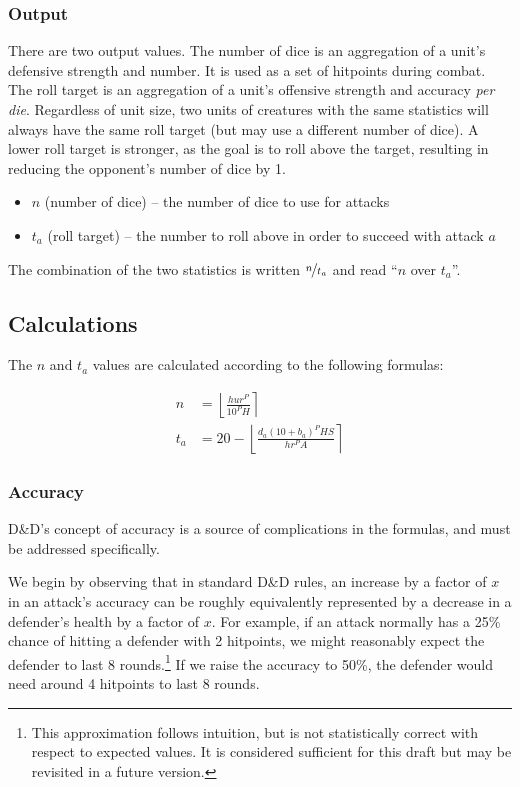 \documentclass[twocolumn]{article}
\begin{document}
\subsubsection{Output}

There are two output values.
The number of dice is an aggregation of a unit's defensive strength and number.
It is used as a set of hitpoints during combat.
The roll target is an aggregation
of a unit's offensive strength and accuracy \emph{per die}.
Regardless of unit size,
two units of creatures with the same statistics
will always have the same roll target
(but may use a different number of dice).
A lower roll target is stronger,
as the goal is to roll above the target,
resulting in reducing the opponent's number of dice by 1.

\begin{itemize}
    \item $n$ (number of dice) -- the number of dice to use for attacks
    \item $t_a$ (roll target) -- the number to roll above in order to succeed with attack $a$
\end{itemize}

The combination of the two statistics is written $\nicefrac{n}{t_a}$
and read ``$n$ over $t_a$''.

\subsection{Calculations}

The $n$ and $t_a$ values are calculated according to the following formulas:

\begin{align*}
    n   &=  
        \left\lfloor
            \frac
                {h u r^P}
                {10^P H}
        \right\rceil \\
    t_a &=
        20 -
        \left\lfloor
            \frac
                {d_a (10 + b_{a})^P H S}
                {h r^P A}
        \right\rceil
\end{align*}

\subsubsection{Accuracy}

D\&D's concept of accuracy is a source of complications in the formulas,
and must be addressed specifically.

We begin by observing that in standard D\&D rules,
an increase by a factor of $x$ in an attack's accuracy
can be roughly equivalently represented by a decrease in a defender's
health by a factor of $x$.
For example, if an attack normally has a 25\% chance of hitting a defender with 2 hitpoints,
we might reasonably expect the defender to last 8 rounds.\footnote{
    This approximation follows intuition,
    but is not statistically correct with respect to expected values.
    It is considered sufficient for this draft
    but may be revisited in a future version.
}
If we raise the accuracy to 50\%,
the defender would need around 4 hitpoints to last 8 rounds.
\end{document}
